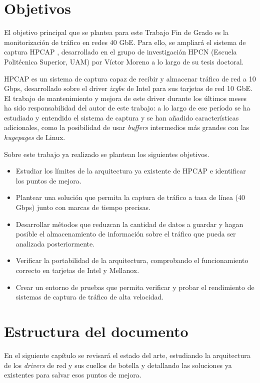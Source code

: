 \documentclass[twoside, 12pt, draft]{epstfg}
\begin{document}
\section{Objetivos}

El objetivo principal que se plantea para este Trabajo Fin de Grado es la monitorización de tráfico en redes 40 GbE. Para ello, se ampliará el sistema de captura HPCAP \cite{victorPhD}, desarrollado en el grupo de investigación HPCN (Escuela Politécnica Superior, UAM) por Víctor Moreno a lo largo de su tesis doctoral.

HPCAP es un sistema de captura capaz de recibir y almacenar tráfico de red a 10 Gbps, desarrollado sobre el \gls{driver} \textit{ixgbe} de Intel para sus tarjetas de red 10 GbE.  El trabajo de mantenimiento y mejora de este driver durante los últimos meses ha sido responsabilidad del autor de este trabajo: a lo largo de ese período se ha estudiado y entendido el sistema de captura y se han añadido características adicionales, como la posibilidad de usar \textit{buffers} intermedios más grandes con las \textit{hugepages} de Linux.

Sobre este trabajo ya realizado se plantean los siguientes objetivos.

\begin{itemize}[itemsep=0pt, topsep = 5pt]
\item Estudiar los límites de la arquitectura ya existente de HPCAP e identificar los puntos de mejora.
\item Plantear una solución que permita la captura de tráfico a tasa de línea (40 Gbps) junto con marcas de tiempo precisas.
\item Desarrollar métodos que reduzcan la cantidad de datos a guardar y hagan posible el almacenamiento de información sobre el tráfico que pueda ser analizada posteriormente.
\item Verificar la portabilidad de la arquitectura, comprobando el funcionamiento correcto en tarjetas de Intel y Mellanox.
\item Crear un entorno de pruebas que permita verificar y probar el rendimiento de sistemas de captura de tráfico de alta velocidad.
\end{itemize}

\section{Estructura del documento}

En el siguiente capítulo se revisará el estado del arte, estudiando la arquitectura de los \textit{drivers} de red y sus cuellos de botella y detallando las soluciones ya existentes para salvar esos puntos de mejora.
\end{document}
